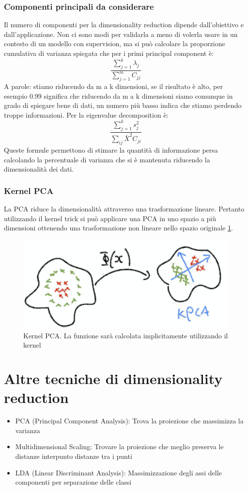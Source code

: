 \subsubsection{Componenti principali da considerare}
Il numero di componenti per la dimensionality reduction dipende dall'obiettivo e dall'applicazione.
Non ci sono modi per validarla a meno di volerla usare in un contesto di un modello con supervision, ma si pu\`o calcolare la proporzione cumulativa di varianza spiegata che per i primi principal component \`e:
$$\frac{\sum\limits_{j = 1}^k\lambda_j}{\sum\limits_{j = 1}^m C_{jj}}$$
A parole: stiamo riducendo da m a k dimensioni, se il risultato \`e alto, per esempio 0.99 significa che riducendo da m a k dimensioni siamo comunque in grado di spiegare bene di dati, un numero pi\`u basso indica che stiamo perdendo troppe informazioni.
Per la eigenvalue decomposition \`e:
$$\frac{\sum\limits_{j = 1}^ks^2_j}{\sum\limits_{ij} \bar{X}^2C_{ji}}$$
Queste formule permettono di stimare la quantit\`a di informazione persa calcolando la percentuale di varianza che si \`e mantenuta riducendo la dimensionalit\`a dei dati.

\subsubsection{Kernel PCA}
La PCA riduce la dimensionalit\`a attraverso una trasformazione lineare.
Pertanto utilizzando il kernel trick si pu\`o applicare una PCA in uno spazio a pi\`u dimensioni ottenendo una trasformazione non lineare nello spazio originale \ref{fig:chapter12-10}.
\begin{figure}
	\centering
	\includegraphics[width=0.6\linewidth]{imgs/chapter12/img10}
	\caption{Kernel PCA. La funzione sar\`a calcolata implicitamente utilizzando il kernel}
	\label{fig:chapter12-10}
\end{figure}
\section{Altre tecniche di dimensionality reduction}
\begin{itemize}
	\item PCA (Principal Component Analysis): Trova la proiezione che massimizza la varianza
	\item Multidimensional Scaling: Trovare la proiezione che meglio preserva le distanze interpunto distanze tra i punti 
	\item LDA (Linear Discriminant Analysis): Massimizzazione degli assi delle componenti per separazione delle classi
\end{itemize}

